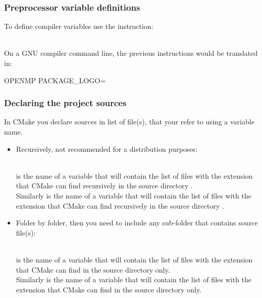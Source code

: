 \subsubsection*{Preprocessor variable definitions}

To define compiler variables use the  instruction:
\begin{script}
\end{script}
\\[-0.25cm]
\noindent On a GNU compiler command line, the previous instructions would be translated in:
\begin{script}
 OPENMP PACKAGE_LOGO=
\end{script}

\subsubsection*{Declaring the project sources}

In CMake you declare sources in list of file(s), that your refer to using a variable name.
\begin{itemize}
\item Recursively, not recommended for a distribution purposes:
{\footnotesize{
\begin{scripti}
\end{scripti}
}} \\[-0.5cm]
\noindent {} is the name of a variable that will contain the list of files with the extension \texttt{} that CMake can find recursively in the source directory \texttt{}. \\
Similarly  is the name of a variable that will contain the list of files with the extension \texttt{} that CMake can find recursively in the source directory \texttt{}.
\item Folder by folder, then you need to include any sub-folder that contains source file(s):
{\footnotesize{
\begin{scripti}
\end{scripti}
}} \\[-0.5cm]
\noindent {} is the name of a variable that will contain the list of files with the extension \texttt{} that CMake can find in the source directory \texttt{} only. \\
Similarly  is the name of a variable that will contain the list of files with the extension \texttt{} that CMake can find in the source directory \texttt{} only. 
\end{itemize}

